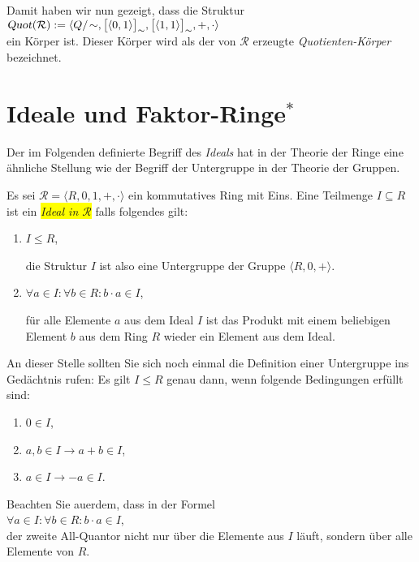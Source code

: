 Damit haben wir nun gezeigt, dass die Struktur
\\[0.2cm]
\hspace*{1.3cm}
$\textsl{Quot}(\mathcal{R}) := \langle Q/\!\sim, \bpr(0,1), \bpr(1,1), +, \cdot \rangle$ 
\\[0.2cm]
ein K\"{o}rper ist.  Dieser K\"{o}rper wird als der von $\mathcal{R}$ erzeugte \emph{Quotienten-K\"{o}rper} bezeichnet.


\section{Ideale und Faktor-Ringe$^*$}
Der im Folgenden definierte Begriff des \emph{Ideals} hat in der Theorie der Ringe eine \"{a}hnliche
Stellung wie der Begriff der Untergruppe in der Theorie der Gruppen.
\begin{Definition}[Ideal]
Es sei $\mathcal{R} = \langle R, 0, 1, +, \cdot \rangle$ ein kommutatives Ring mit Eins.
Eine Teilmenge $I \subseteq R$ ist ein \colorbox{yellow}{\emph{Ideal in $\mathcal{R}$}} falls folgendes gilt:
\begin{enumerate}
\item $I \leq R$,

      die Struktur $I$ ist also eine Untergruppe der Gruppe $\langle R, 0, + \rangle$.
\item $\forall a \in I: \forall b \in R: b \cdot a \in I$,

      f\"{u}r alle Elemente $a$ aus dem Ideal $I$ ist das Produkt mit einem beliebigen Element
      $b$ aus dem Ring $R$ wieder ein Element aus dem Ideal. \eox
\end{enumerate}
\end{Definition}

\remark
An dieser Stelle sollten Sie sich noch einmal die Definition einer Untergruppe ins
Ged\"{a}chtnis rufen:  Es gilt $I \leq R$ genau
dann, wenn folgende Bedingungen erf\"{u}llt sind:
\begin{enumerate}
\item $0 \in I$,
\item $a,b \in I \rightarrow a + b \in I$,
\item $a \in I \rightarrow -a \in I$.
\end{enumerate}
Beachten Sie au\3erdem, dass in der Formel 
\\[0.2cm]
\hspace*{1.3cm}
$\forall a \in I: \forall b \in R: b \cdot a \in I$,
\\[0.2cm]
der zweite All-Quantor nicht nur \"{u}ber die Elemente aus $I$ l\"{a}uft, sondern \"{u}ber alle Elemente
von $R$.  \eox
\pagebreak

